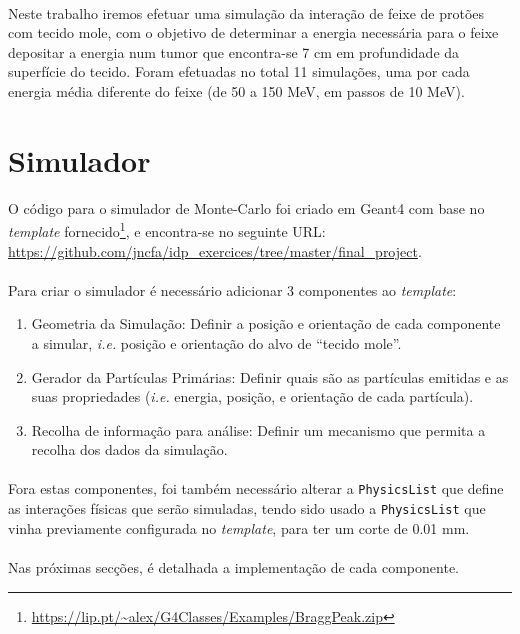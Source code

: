 \documentclass[a4paper, 12pt]{article} %
\begin{document}
	\paragraph{} Neste trabalho iremos efetuar uma simulação da interação de feixe de protões com tecido mole, com o objetivo de determinar a energia necessária para o feixe depositar a energia num tumor que encontra-se 7 cm em profundidade da superfície do tecido. Foram efetuadas no total 11 simulações, uma por cada energia média diferente do feixe (de 50 a 150 MeV, em passos de 10 MeV).

	\section{Simulador}
	O código para o simulador de Monte-Carlo foi criado em Geant4 com base no \textit{template} fornecido\footnote{\url{https://lip.pt/~alex/G4Classes/Examples/BraggPeak.zip}}, e encontra-se no seguinte URL: \url{https://github.com/jncfa/idp_exercices/tree/master/final_project}.

	\paragraph{} Para criar o simulador é necessário adicionar 3 componentes ao \textit{template}:
	
	\begin{enumerate}
		\item Geometria da Simulação: Definir a posição e orientação de cada componente a simular, \textit{i.e.} posição e orientação do alvo de ``tecido mole''.
		\item Gerador da Partículas Primárias: Definir quais são as partículas emitidas e as suas propriedades (\textit{i.e.} energia, posição, e orientação de cada partícula).
		\item Recolha de informação para análise: Definir um mecanismo que permita a recolha dos dados da simulação.
	\end{enumerate}

	\paragraph{} Fora estas componentes, foi também necessário alterar a \texttt{PhysicsList} que define as interações físicas que serão simuladas, tendo sido usado a \texttt{PhysicsList} que vinha previamente configurada no \textit{template}, para ter um corte de 0.01 mm.

	\paragraph{} Nas próximas secções, é detalhada a implementação de cada componente.
	
\end{document}
